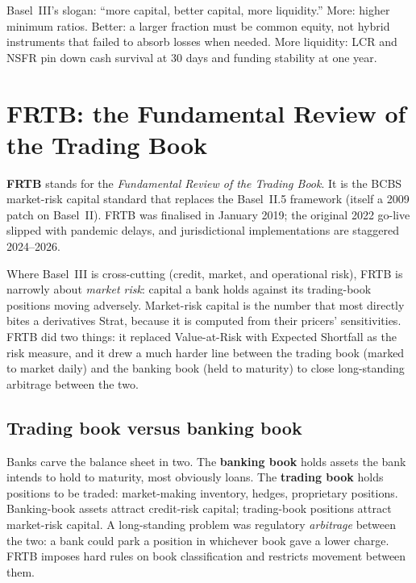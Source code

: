 \begin{intuitionbox}
Basel~III's slogan: ``more capital, better capital, more
liquidity.''  More: higher minimum ratios.  Better: a larger
fraction must be common equity, not hybrid instruments that
failed to absorb losses when needed.  More liquidity: LCR and
NSFR pin down cash survival at 30 days and funding stability at
one year.
\end{intuitionbox}


\section{FRTB: the Fundamental Review of the Trading Book}
\label{sec:frtb}

\textbf{FRTB} stands for the \emph{Fundamental Review of the
Trading Book}.  It is the BCBS market-risk capital standard that
replaces the Basel~II.5 framework (itself a 2009 patch on
Basel~II).  FRTB was finalised in January 2019; the original 2022
go-live slipped with pandemic delays, and jurisdictional
implementations are staggered 2024--2026.

Where Basel~III is cross-cutting (credit, market, and operational
risk), FRTB is narrowly about \emph{market risk}: capital a bank
holds against its trading-book positions moving adversely.
Market-risk capital is the number that most directly bites a
derivatives Strat, because it is computed from their pricers'
sensitivities.  FRTB did two things: it replaced
Value-at-Risk with Expected Shortfall as the risk measure, and
it drew a much harder line between the trading book (marked to
market daily) and the banking book (held to maturity) to close
long-standing arbitrage between the two.

\subsection{Trading book versus banking book}

Banks carve the balance sheet in two.  The \textbf{banking book}
holds assets the bank intends to hold to maturity, most
obviously loans.  The \textbf{trading book} holds positions to be
traded: market-making inventory, hedges, proprietary positions.
Banking-book assets attract credit-risk capital; trading-book
positions attract market-risk capital.  A long-standing problem
was regulatory \emph{arbitrage} between the two: a bank could
park a position in whichever book gave a lower charge.  FRTB
imposes hard rules on book classification and restricts movement
between them.

